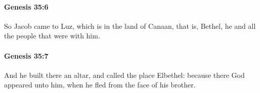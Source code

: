 		\paragraph{Genesis 35:6} %
			\label{GENESIS-35-6}

			So Jacob came to Luz, which is in the land of Canaan, that is, Bethel, he and all the people that were with him.


		\paragraph{Genesis 35:7} %
			\label{GENESIS-35-7}

			And he built there an altar, and called the place Elbethel: because there God appeared unto him, when he fled from the face of his brother.


